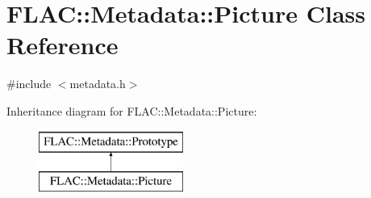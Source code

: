\hypertarget{class_f_l_a_c_1_1_metadata_1_1_picture}{}\section{F\+L\+AC\+:\+:Metadata\+:\+:Picture Class Reference}
\label{class_f_l_a_c_1_1_metadata_1_1_picture}


{\ttfamily \#include $<$metadata.\+h$>$}

Inheritance diagram for F\+L\+AC\+:\+:Metadata\+:\+:Picture\+:\begin{figure}[H]
\begin{center}
\leavevmode
\includegraphics[height=2.000000cm]{class_f_l_a_c_1_1_metadata_1_1_picture}
\end{center}
\end{figure}
